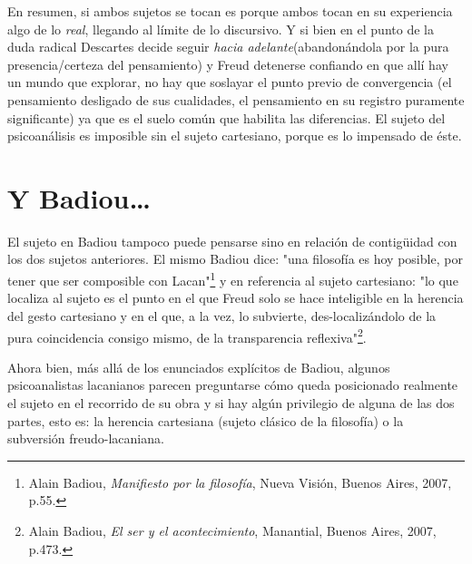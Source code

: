 \documentclass{book}
\begin{document}
En resumen, si ambos sujetos se tocan es porque ambos tocan en su
experiencia algo de lo \emph{real}, llegando al límite de lo discursivo.
Y si bien en el punto de la duda radical Descartes decide seguir
\emph{hacia adelante}(abandonándola por la pura presencia/certeza del
pensamiento) y Freud detenerse confiando en que allí hay un mundo que
explorar, no hay que soslayar el punto previo de convergencia (el
pensamiento desligado de sus cualidades, el pensamiento en su registro
puramente significante) ya que es el suelo común que habilita las
diferencias. El sujeto del psicoanálisis es imposible sin el sujeto
cartesiano, porque es lo impensado de éste.

\section{Y Badiou\ldots}

El sujeto en Badiou tampoco puede pensarse sino en relación de
contigüidad con los dos sujetos anteriores. El mismo Badiou dice: "una
filosofía es hoy posible, por tener que ser composible con
Lacan"\footnote{Alain Badiou, \emph{Manifiesto por la filosofía}, Nueva
  Visión, Buenos Aires, 2007, p.55.} y en referencia al sujeto
cartesiano: "lo que localiza al sujeto es el punto en el que Freud solo
se hace inteligible en la herencia del gesto cartesiano y en el que, a
la vez, lo subvierte, des-localizándolo de la pura coincidencia consigo
mismo, de la transparencia reflexiva"\footnote{Alain Badiou, \emph{El
  ser y el acontecimiento}, Manantial, Buenos Aires, 2007, p.473.}.

Ahora bien, más allá de los enunciados explícitos de Badiou, algunos
psicoanalistas lacanianos parecen preguntarse cómo queda posicionado
realmente el sujeto en el recorrido de su obra y si hay algún privilegio
de alguna de las dos partes, esto es: la herencia cartesiana (sujeto
clásico de la filosofía) o la subversión freudo-lacaniana.
\end{document}
